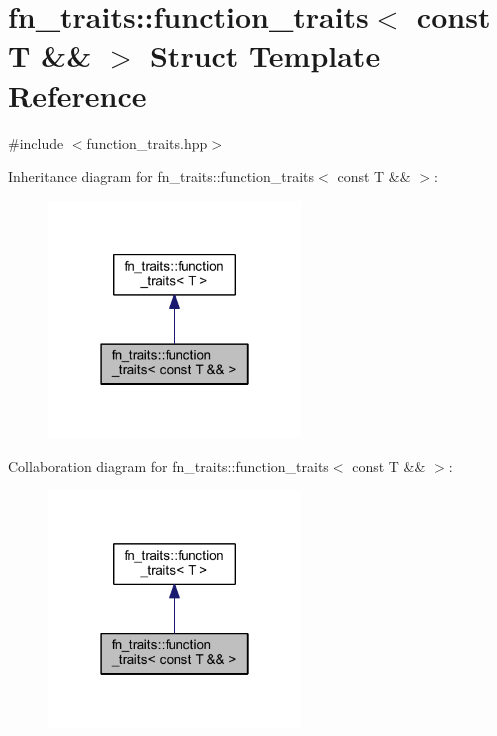 \hypertarget{structfn__traits_1_1function__traits_3_01const_01_t_01_6_6_01_4}{}\section{fn\+\_\+traits\+:\+:function\+\_\+traits$<$ const T \&\& $>$ Struct Template Reference}
\label{structfn__traits_1_1function__traits_3_01const_01_t_01_6_6_01_4}


{\ttfamily \#include $<$function\+\_\+traits.\+hpp$>$}



Inheritance diagram for fn\+\_\+traits\+:\+:function\+\_\+traits$<$ const T \&\& $>$\+:\nopagebreak
\begin{figure}[H]
\begin{center}
\leavevmode
\includegraphics[width=190pt]{d9/daa/structfn__traits_1_1function__traits_3_01const_01_t_01_6_6_01_4__inherit__graph}
\end{center}
\end{figure}


Collaboration diagram for fn\+\_\+traits\+:\+:function\+\_\+traits$<$ const T \&\& $>$\+:\nopagebreak
\begin{figure}[H]
\begin{center}
\leavevmode
\includegraphics[width=190pt]{de/db9/structfn__traits_1_1function__traits_3_01const_01_t_01_6_6_01_4__coll__graph}
\end{center}
\end{figure}


